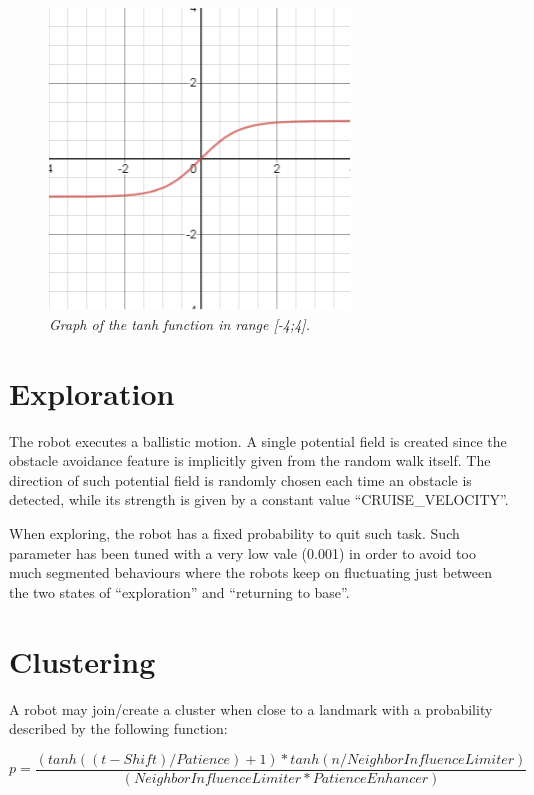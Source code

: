 \begin{figure}[H]
\centering
\includegraphics[width=8cm, keepaspectratio]{images/tanh.png}
\caption{\textit{Graph of the tanh function in range [-4;4].}}
\label{fig:tanh}
\end{figure}

\section{Exploration}

The robot executes a ballistic motion. A single potential field is created since the obstacle avoidance feature is implicitly given from the random walk itself. The direction of such potential field is randomly chosen each time an obstacle is detected, while its strength is given by a constant value ``CRUISE\_VELOCITY''. 

\smallskip
When exploring, the robot has a fixed probability to quit such task. Such parameter has been tuned with a very low vale (0.001) in order to avoid too much segmented behaviours where the robots keep on fluctuating just between the two states of ``exploration'' and ``returning to base''.  

\section{Clustering}

A robot may join/create a cluster when close to a landmark with a probability described by the following function:

\begin{equation}
    p =  \frac{(tanh((t - Shift) / Patience) + 1) * tanh(n / NeighborInfluenceLimiter)}{(NeighborInfluenceLimiter * PatienceEnhancer)} \tag{3.2}\label{eq:3.2}
\end{equation}

